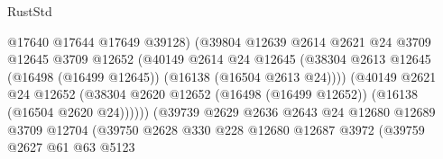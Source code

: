 \begin{lexlean}{RustStd}
\begin{coremodule}
                                          @17640
                                          @17644
                                          @17649
                                          @39128)
                                        (@39804
                                          @12639
                                          @2614
                                          @2621
                                          @24
                                          @3709
                                          @12645
                                          @3709
                                          @12652
                                          (@40149
                                            @2614
                                            @24
                                            @12645
                                            (@38304
                                              @2613
                                              @12645
                                              (@16498 (@16499 @12645))
                                              (@16138 (@16504 @2613 @24))))
                                          (@40149
                                            @2621
                                            @24
                                            @12652
                                            (@38304
                                              @2620
                                              @12652
                                              (@16498 (@16499 @12652))
                                              (@16138 (@16504 @2620 @24))))))
                                      (@39739
                                        @2629
                                        @2636
                                        @2643
                                        @24
                                        @12680
                                        @12689
                                        @3709
                                        @12704
                                        (@39750
                                          @2628
                                          @330
                                          @228
                                          @12680
                                          @12687
                                          @3972
                                          (@39759
                                            @2627
                                            @61
                                            @63
                                            @5123

\end{coremodule}
\end{lexlean}

